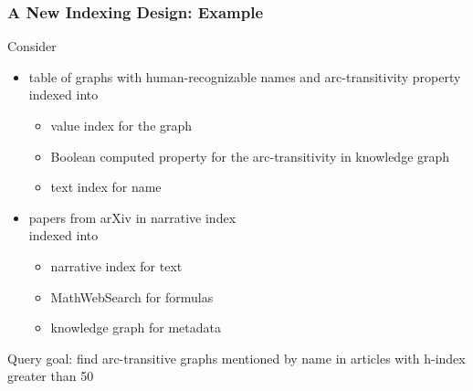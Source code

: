 \begin{frame}\frametitle{A New Indexing Design: Example}
Consider
\begin{itemize}
\item table of graphs with human-recognizable names and arc-transitivity property\\
indexed into
\begin{itemize}
\item value index for the graph 
\item Boolean computed property for the arc-transitivity in knowledge graph
\item text index for name
\end{itemize}
\item papers from arXiv in narrative index\\
indexed into
\begin{itemize}
\item narrative index for text
\item MathWebSearch for formulas
\item knowledge graph for metadata
\end{itemize}
\end{itemize}

Query goal: find arc-transitive graphs mentioned by name in articles with h-index greater than 50

%
%
%
\end{frame}

